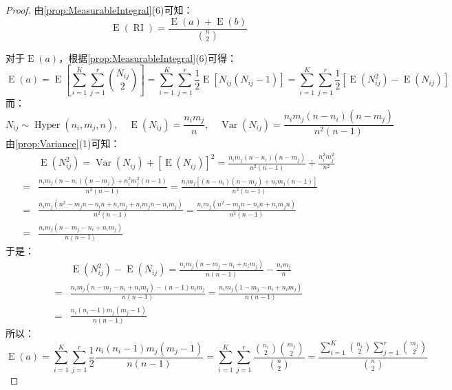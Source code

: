 \begin{proof}
	由\cref{prop:MeasurableIntegral}(6)可知：
	\begin{equation*}
		\operatorname{E}(\operatorname{RI})=\frac{\operatorname{E}(a)+\operatorname{E}(b)}{\binom{n}{2}}
	\end{equation*}\par
	对于$\operatorname{E}(a)$，根据\cref{prop:MeasurableIntegral}(6)可得：
	\begin{equation*}
		\operatorname{E}(a)=\operatorname{E}\left[\sum_{i=1}^{K}\sum_{j=1}^{r}\binom{N_{ij}}{2}\right]=\sum_{i=1}^{K}\sum_{j=1}^{r}\frac{1}{2}\operatorname{E}[N_{ij}(N_{ij}-1)]=\sum_{i=1}^{K}\sum_{j=1}^{r}\frac{1}{2}[\operatorname{E}(N_{ij}^2)-\operatorname{E}(N_{ij})]
	\end{equation*}
	而：
	\begin{equation*}
		N_{ij}\sim\operatorname{Hyper}(n_i,m_j,n),\quad\operatorname{E}(N_{ij})=\frac{n_im_j}{n},\quad\operatorname{Var}(N_{ij})=\frac{n_im_j(n-n_i)(n-m_j)}{n^2(n-1)}
	\end{equation*}
	由\cref{prop:Variance}(1)可知：
	\begin{align*}
		&\operatorname{E}(N_{ij}^2)=\operatorname{Var}(N_{ij})+[\operatorname{E}(N_{ij})]^2=\frac{n_im_j(n-n_i)(n-m_j)}{n^2(n-1)}+\frac{n_i^2m_j^2}{n^2} \\
		=&\frac{n_im_j(n-n_i)(n-m_j)+n_i^2m_j^2(n-1)}{n^2(n-1)}=\frac{n_im_j[(n-n_i)(n-m_j)+n_im_j(n-1)]}{n^2(n-1)} \\
		=&\frac{n_im_j(n^2-m_jn-n_in+n_im_j+n_im_jn-n_im_j)}{n^2(n-1)}=\frac{n_im_j(n^2-m_jn-n_in+n_im_jn)}{n^2(n-1)} \\
		=&\frac{n_im_j(n-m_j-n_i+n_im_j)}{n(n-1)} 
	\end{align*}
	于是：
	\begin{align*}
		&\operatorname{E}(N_{ij}^2)-\operatorname{E}(N_{ij})=\frac{n_im_j(n-m_j-n_i+n_im_j)}{n(n-1)}-\frac{n_im_j}{n} \\
		=&\frac{n_im_j(n-m_j-n_i+n_im_j)-(n-1)n_im_j}{n(n-1)}=\frac{n_im_j(1-m_j-n_i+n_im_j)}{n(n-1)} \\
		=&\frac{n_i(n_i-1)m_j(m_j-1)}{n(n-1)}
	\end{align*}
	所以：
	\begin{equation*}
		\operatorname{E}(a)=\sum_{i=1}^{K}\sum_{j=1}^{r}\frac{1}{2}\frac{n_i(n_i-1)m_j(m_j-1)}{n(n-1)}=\sum_{i=1}^{K}\sum_{j=1}^{r}\frac{\binom{n_i}{2}\binom{m_j}{2}}{\binom{n}{2}}=\frac{\sum\limits_{i=1}^{K}\binom{n_i}{2}\sum\limits_{j=1}^{r}\binom{m_j}{2}}{\binom{n}{2}}

\end{equation*}
\end{proof}

